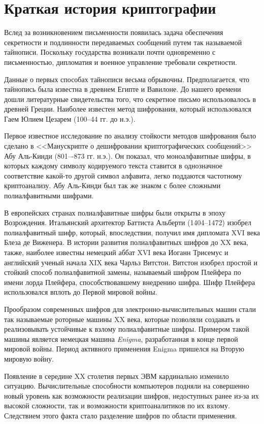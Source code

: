 \section{Краткая история криптографии}

Вслед за возникновением письменности появилась задача обеспечения секретности и подлинности передаваемых сообщений путем так называемой тайнописи. Поскольку государства возникали почти одновременно с письменностью, дипломатия и военное управление требовали секретности.

Данные о первых способах тайнописи весьма обрывочны. Предполагается, что тайнопись была известна в древнем Египте и Вавилоне. До нашего времени дошли литературные свидетельства того, что  секретное письмо использовалось в древней Греции. Наиболее известен метод шифрования, который использовался Гаем Юлием Цезарем (100--44 гг. до н.э.).

Первое известное исследование по анализу стойкости методов шифрования было сделано в <<Манускрипте о дешифровании криптографических сообщений>> Абу Аль-Кинди (801–-873 гг. н.э.). Он показал, что моноалфавитные шифры, в которых каждому символу кодируемого текста ставится в однозначное соответствие  какой-то другой символ алфавита, легко поддаются частотному криптоанализу. Абу Аль-Кинди был так же знаком с более сложными полиалфавитными шифрами.

В европейских странах полиалфавитные шифры были открыты в эпоху Возрождения. Итальянский архитектор Баттиста Альберти (1404--1472) изобрел полиалфавитный шифр, который, впоследствии, получил имя дипломата XVI века Блеза де Виженера. В истории развития полиалфавитных шифров до XX века, также, наиболее известны немецкий аббат XVI века Иоганн Трисемус и английский ученый начала XIX века Чарльз Витстон. Витстон изобрел простой и стойкий способ полиалфавитной замены, называемый шифром Плейфера по имени лорда Плейфера, способствовавшему внедрению шифра. Шифр Плейфера использовался вплоть до Первой мировой войны.

Прообразом современных шифров для электронно-вычислительных машин стали так называемые роторные машины XX века, которые позволяли создавать и реализовывать устойчивые к взлому полиалфавитные шифры. Примером такой машины является немецкая машина \emph{Enigma}, разработанная в конце первой мировой войны. Период активного применения Enigma пришелся на Вторую мировую войну.

Появление в середине  XX столетия первых ЭВМ кардинально изменило ситуацию. Вычислительные способности компьютеров подняли на совершенно новый уровень как возможности реализации шифров, недоступных ранее из-за их высокой сложности, так и возможности криптоаналитиков по их взлому. Следствием этого факта стало разделение шифров по области применения.

